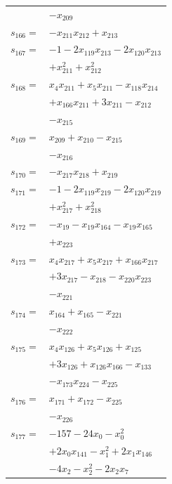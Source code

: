 \begin{longtable}{@{}r@{\;}l@{}}
 & \(\displaystyle -x_{209}\) \\[3pt]
\(s_{166}=\) & \(\displaystyle -x_{211}x_{212} +x_{213}\) \\[3pt]
\(s_{167}=\) & \(\displaystyle -1 -2x_{119}x_{213} -2x_{120}x_{213}\) \\
 & \(\displaystyle +x_{211}^{2} +x_{212}^{2}\) \\[3pt]
\(s_{168}=\) & \(\displaystyle x_{4}x_{211} +x_{5}x_{211} -x_{118}x_{214}\) \\
 & \(\displaystyle +x_{166}x_{211} +3x_{211} -x_{212}\) \\
 & \(\displaystyle -x_{215}\) \\[3pt]
\(s_{169}=\) & \(\displaystyle x_{209} +x_{210} -x_{215}\) \\
 & \(\displaystyle -x_{216}\) \\[3pt]
\(s_{170}=\) & \(\displaystyle -x_{217}x_{218} +x_{219}\) \\[3pt]
\(s_{171}=\) & \(\displaystyle -1 -2x_{119}x_{219} -2x_{120}x_{219}\) \\
 & \(\displaystyle +x_{217}^{2} +x_{218}^{2}\) \\[3pt]
\(s_{172}=\) & \(\displaystyle -x_{19} -x_{19}x_{164} -x_{19}x_{165}\) \\
 & \(\displaystyle +x_{223}\) \\[3pt]
\(s_{173}=\) & \(\displaystyle x_{4}x_{217} +x_{5}x_{217} +x_{166}x_{217}\) \\
 & \(\displaystyle +3x_{217} -x_{218} -x_{220}x_{223}\) \\
 & \(\displaystyle -x_{221}\) \\[3pt]
\(s_{174}=\) & \(\displaystyle x_{164} +x_{165} -x_{221}\) \\
 & \(\displaystyle -x_{222}\) \\[3pt]
\(s_{175}=\) & \(\displaystyle x_{4}x_{126} +x_{5}x_{126} +x_{125}\) \\
 & \(\displaystyle +3x_{126} +x_{126}x_{166} -x_{133}\) \\
 & \(\displaystyle -x_{173}x_{224} -x_{225}\) \\[3pt]
\(s_{176}=\) & \(\displaystyle x_{171} +x_{172} -x_{225}\) \\
 & \(\displaystyle -x_{226}\) \\[3pt]
\(s_{177}=\) & \(\displaystyle -157 -24x_{0} -x_{0}^{2}\) \\
 & \(\displaystyle +2x_{0}x_{141} -x_{1}^{2} +2x_{1}x_{146}\) \\
 & \(\displaystyle -4x_{2} -x_{2}^{2} -2x_{2}x_{7}\) \\

\end{longtable}
